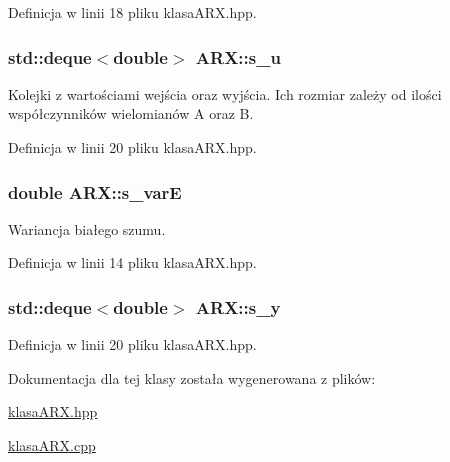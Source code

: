 Definicja w linii 18 pliku klasa\-A\-R\-X.\-hpp.

\hypertarget{class_a_r_x_af61ad06d76ce7b19daa55ee0f59639e7}{
\subsubsection[{s\-\_\-u}]{\setlength{\rightskip}{0pt plus 5cm}std\-::deque$<$double$>$ A\-R\-X\-::s\-\_\-u\hspace{0.3cm}{\ttfamily [protected]}}}\label{class_a_r_x_af61ad06d76ce7b19daa55ee0f59639e7}


Kolejki z wartościami wejścia oraz wyjścia. Ich rozmiar zależy od ilości współczynników wielomianów A oraz B. 



Definicja w linii 20 pliku klasa\-A\-R\-X.\-hpp.

\hypertarget{class_a_r_x_a3361b14c8d2d075a3c23e7d2f07c8592}{
\subsubsection[{s\-\_\-var\-E}]{\setlength{\rightskip}{0pt plus 5cm}double A\-R\-X\-::s\-\_\-var\-E\hspace{0.3cm}{\ttfamily [private]}}}\label{class_a_r_x_a3361b14c8d2d075a3c23e7d2f07c8592}


Wariancja białego szumu. 



Definicja w linii 14 pliku klasa\-A\-R\-X.\-hpp.

\hypertarget{class_a_r_x_aaeb3515374c95f4b7ed58c9676d89639}{
\subsubsection[{s\-\_\-y}]{\setlength{\rightskip}{0pt plus 5cm}std\-::deque$<$double$>$ A\-R\-X\-::s\-\_\-y\hspace{0.3cm}{\ttfamily [protected]}}}\label{class_a_r_x_aaeb3515374c95f4b7ed58c9676d89639}


Definicja w linii 20 pliku klasa\-A\-R\-X.\-hpp.



Dokumentacja dla tej klasy została wygenerowana z plików\-:\begin{DoxyCompactItemize}
\item 
\hyperlink{klasa_a_r_x_8hpp}{klasa\-A\-R\-X.\-hpp}\item 
\hyperlink{klasa_a_r_x_8cpp}{klasa\-A\-R\-X.\-cpp}\end{DoxyCompactItemize}
